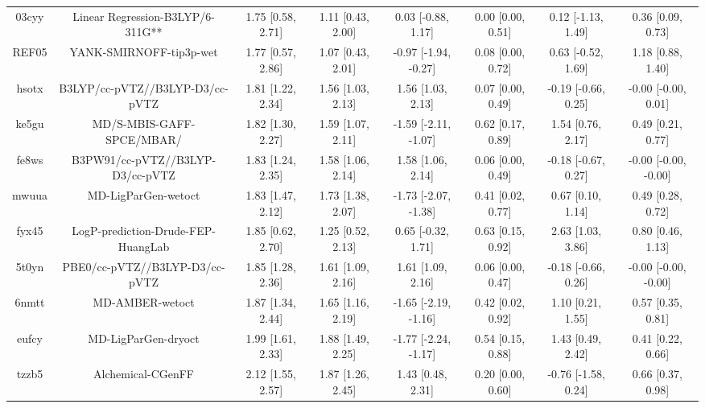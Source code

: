\documentclass{article}
\begin{document}
\begin{center}
\begin{longtable}{|cccccccc|}
 03cyy &                   Linear Regression-B3LYP/6-311G** &  1.75 [0.58, 2.71] &  1.11 [0.43, 2.00] &    0.03 [-0.88, 1.17] &  0.00 [0.00, 0.51] &   0.12 [-1.13, 1.49] &     0.36 [0.09, 0.73] \\
 REF05 &                            YANK-SMIRNOFF-tip3p-wet &  1.77 [0.57, 2.86] &  1.07 [0.43, 2.01] &  -0.97 [-1.94, -0.27] &  0.08 [0.00, 0.72] &   0.63 [-0.52, 1.69] &     1.18 [0.88, 1.40] \\
 hsotx &                    B3LYP/cc-pVTZ//B3LYP-D3/cc-pVTZ &  1.81 [1.22, 2.34] &  1.56 [1.03, 2.13] &     1.56 [1.03, 2.13] &  0.07 [0.00, 0.49] &  -0.19 [-0.66, 0.25] &   -0.00 [-0.00, 0.01] \\
 ke5gu &                          MD/S-MBIS-GAFF-SPCE/MBAR/ &  1.82 [1.30, 2.27] &  1.59 [1.07, 2.11] &  -1.59 [-2.11, -1.07] &  0.62 [0.17, 0.89] &    1.54 [0.76, 2.17] &     0.49 [0.21, 0.77] \\
 fe8ws &                   B3PW91/cc-pVTZ//B3LYP-D3/cc-pVTZ &  1.83 [1.24, 2.35] &  1.58 [1.06, 2.14] &     1.58 [1.06, 2.14] &  0.06 [0.00, 0.49] &  -0.18 [-0.67, 0.27] &  -0.00 [-0.00, -0.00] \\
 mwuua &                                MD-LigParGen-wetoct &  1.83 [1.47, 2.12] &  1.73 [1.38, 2.07] &  -1.73 [-2.07, -1.38] &  0.41 [0.02, 0.77] &    0.67 [0.10, 1.14] &     0.49 [0.28, 0.72] \\
 fyx45 &                 LogP-prediction-Drude-FEP-HuangLab &  1.85 [0.62, 2.70] &  1.25 [0.52, 2.13] &    0.65 [-0.32, 1.71] &  0.63 [0.15, 0.92] &    2.63 [1.03, 3.86] &     0.80 [0.46, 1.13] \\
 5t0yn &                     PBE0/cc-pVTZ//B3LYP-D3/cc-pVTZ &  1.85 [1.28, 2.36] &  1.61 [1.09, 2.16] &     1.61 [1.09, 2.16] &  0.06 [0.00, 0.47] &  -0.18 [-0.66, 0.26] &  -0.00 [-0.00, -0.00] \\
 6nmtt &                                    MD-AMBER-wetoct &  1.87 [1.34, 2.44] &  1.65 [1.16, 2.19] &  -1.65 [-2.19, -1.16] &  0.42 [0.02, 0.92] &    1.10 [0.21, 1.55] &     0.57 [0.35, 0.81] \\
 eufcy &                                MD-LigParGen-dryoct &  1.99 [1.61, 2.33] &  1.88 [1.49, 2.25] &  -1.77 [-2.24, -1.17] &  0.54 [0.15, 0.88] &    1.43 [0.49, 2.42] &     0.41 [0.22, 0.66] \\
 tzzb5 &                                  Alchemical-CGenFF &  2.12 [1.55, 2.57] &  1.87 [1.26, 2.45] &     1.43 [0.48, 2.31] &  0.20 [0.00, 0.60] &  -0.76 [-1.58, 0.24] &     0.66 [0.37, 0.98] \\

\end{longtable}
\end{center}
\end{document}
